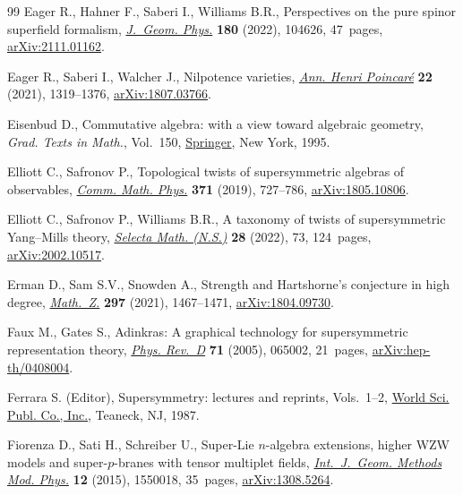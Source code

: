\documentclass[10pt,a4paper]{amsart}
\numberwithin{equation}{section}
\begin{document}
\begin{thebibliography}{99}
Eager R., Hahner F., Saberi I., Williams B.R., Perspectives on the pure spinor
 superfield formalism, \href{https://doi.org/10.1016/j.geomphys.2022.104626}{\textit{J.~Geom. Phys.}} \textbf{180} (2022), 104626,
 47~pages, \href{https://arxiv.org/abs/2111.01162}{arXiv:2111.01162}.

Eager R., Saberi I., Walcher J., Nilpotence varieties, \href{https://doi.org/10.1007/s00023-020-01007-y}{\textit{Ann. Henri
 Poincar\'e}} \textbf{22} (2021), 1319--1376, \href{https://arxiv.org/abs/1807.03766}{arXiv:1807.03766}.

Eisenbud D., Commutative algebra: with a view toward algebraic geometry,
 \textit{Grad. Texts in Math.}, Vol.~150, \href{https://doi.org/10.1007/978-1-4612-5350-1}{Springer}, New York, 1995.

Elliott C., Safronov P., Topological twists of supersymmetric algebras of
 observables, \href{https://doi.org/10.1007/s00220-019-03393-9}{\textit{Comm. Math. Phys.}} \textbf{371} (2019), 727--786,
 \href{https://arxiv.org/abs/1805.10806}{arXiv:1805.10806}.

Elliott C., Safronov P., Williams B.R., A taxonomy of twists of supersymmetric
 {Y}ang--{M}ills theory, \href{https://doi.org/10.1007/s00029-022-00786-y}{\textit{Selecta Math. (N.S.)}} \textbf{28} (2022), 73,
 124~pages, \href{https://arxiv.org/abs/2002.10517}{arXiv:2002.10517}.

Erman D., Sam S.V., Snowden A., Strength and {H}artshorne's conjecture in high
 degree, \href{https://doi.org/10.1007/s00209-020-02564-y}{\textit{Math.~Z.}} \textbf{297} (2021), 1467--1471,
 \href{https://arxiv.org/abs/1804.09730}{arXiv:1804.09730}.

Faux M., Gates S., Adinkras: A graphical technology for supersymmetric
 representation theory, \href{https://link.aps.org/doi/10.1103/PhysRevD.71.065002}{\textit{Phys. Rev.~D}} \textbf{71} (2005), 065002,
 21~pages, \href{https://arxiv.org/abs/hep-th/0408004}{arXiv:hep-th/0408004}.

Ferrara S. (Editor), Supersymmetry: lectures and reprints, Vols.~1--2, \href{https://doi.org/10.1142/0091}{World
 Sci. Publ. Co., Inc.}, Teaneck, NJ, 1987.

Fiorenza D., Sati H., Schreiber U., Super-{L}ie {$n$}-algebra extensions,
 higher {WZW} models and super-{$p$}-branes with tensor multiplet fields,
 \href{https://doi.org/10.1142/S0219887815500188}{\textit{Int.~J.~Geom. Methods Mod. Phys.}} \textbf{12} (2015), 1550018,
 35~pages, \href{https://arxiv.org/abs/1308.5264}{arXiv:1308.5264}.


\end{thebibliography}
\end{document}
